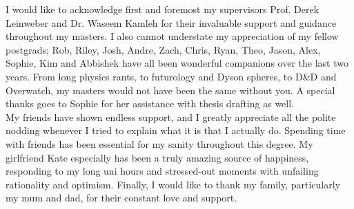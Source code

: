 
\begin{acknowledgements}      


I would like to acknowledge first and foremost my supervisors Prof. Derek Leinweber and Dr. Waseem Kamleh for their invaluable support and guidance throughout my masters. I also cannot understate my appreciation of my fellow postgrads; Rob, Riley, Josh, Andre, Zach, Chris, Ryan, Theo, Jason, Alex, Sophie, Kim and Abbishek have all been wonderful companions over the last two years. From long physics rants, to futurology and Dyson spheres, to D\&D and Overwatch, my masters would not have been the same without you. A special thanks goes to Sophie for her assistance with thesis drafting as well.\\

My friends have shown endless support, and I greatly appreciate all the polite nodding whenever I tried to explain what it is that I actually do. Spending time with friends has been essential for my sanity throughout this degree. My girlfriend Kate especially has been a truly amazing source of happiness, responding to my long uni hours and stressed-out moments with unfailing rationality and optimism. Finally, I would like to thank my family, particularly my mum and dad, for their constant love and support.  


\end{acknowledgements}
